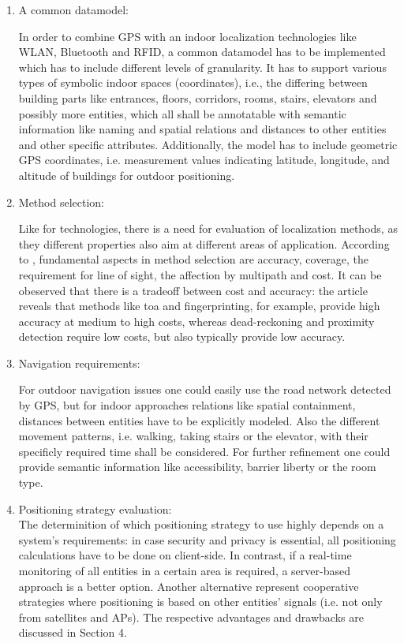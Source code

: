 \begin{enumerate}
	\item A common datamodel:
	
	In order to combine GPS with an indoor localization technologies like WLAN, Bluetooth and RFID, a common datamodel has to be implemented which has to include different levels of granularity.
	It has to support various types of symbolic indoor spaces (coordinates), i.e., the differing between building parts like entrances, floors, corridors, rooms, stairs, elevators and possibly more entities, which all shall be annotatable with semantic information like naming and spatial relations and distances to other entities and other specific attributes. Additionally, the model has to include geometric GPS coordinates, i.e. measurement values indicating latitude, longitude, and altitude of buildings for outdoor positioning.

	\item Method selection:
	
	Like for technologies, there is a need for evaluation of localization methods, as they different properties also aim at different areas of application. 
	According to \cite{recentAdvances}, fundamental aspects in method selection are accuracy, coverage, the requirement for line of sight, the affection by multipath and cost.
	It can be obeserved that there is a tradeoff between cost and accuracy: the article reveals that methods like \ac{toa} and fingerprinting, for example, provide high accuracy at medium to high costs, whereas dead-reckoning and proximity detection require low costs, but also typically provide low accuracy.

	\item Navigation requirements:
	
	For outdoor navigation issues one could easily use the road network detected by GPS, but for indoor approaches relations like spatial containment, distances between entities have to be explicitly modeled. Also the different movement patterns, i.e. walking, taking stairs or the elevator, with their specificly required time shall be considered. For further refinement one could provide semantic information like accessibility, barrier liberty or the room type.
	\item Positioning strategy evaluation:\\
	The determinition of which positioning strategy to use highly depends on a system's requirements: in case security and privacy is essential, all positioning calculations have to be done on client-side. In contrast, if a real-time monitoring of all entities in a certain area is required, a server-based approach is a better option.
	Another alternative represent cooperative strategies where positioning is based on other entities' signals (i.e. not only from satellites and APs). The respective advantages and drawbacks are discussed in Section 4.
\end{enumerate}
		
	
